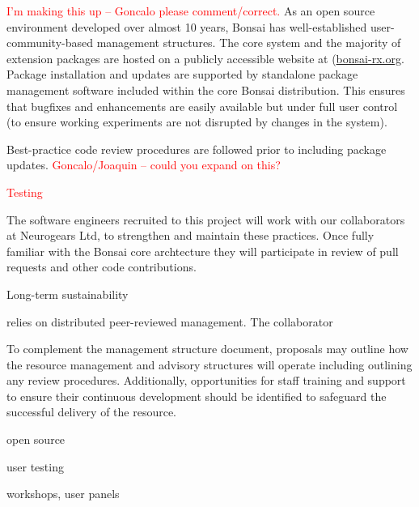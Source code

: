 \textcolor{red}{I'm making this up -- Goncalo please comment/correct.}
%
As an open source environment developed over almost 10 years, Bonsai 
has well-established user-community-based management structures.
%
The core system and the majority of extension packages are hosted on a
publicly accessible website at (\url{bonsai-rx.org}.
%
Package installation and updates are supported by standalone package
management software included within the core Bonsai distribution.
%
This ensures that bugfixes and enhancements are easily available but
under full user control (to ensure working experiments are not
disrupted by changes in the system).

Best-practice code review procedures are followed prior to including
package updates.  \textcolor{red}{Goncalo/Joaquin -- could you expand
  on this?}

\textcolor{red}{Testing}

The software engineers recruited to this project will work with our
collaborators at Neurogears Ltd, to strengthen and maintain these
practices.  Once fully familiar with the Bonsai core archtecture they
will participate in review of pull requests and other code
contributions.  



Long-term sustainability






relies on distributed peer-reviewed management.  The collaborator 


To complement the management structure document, proposals may outline
how the resource management and advisory structures will operate including
outlining any review procedures.
Additionally, opportunities for staff training and support to ensure their
continuous development should be identified to safeguard the successful
delivery of the resource.



open source

user testing

workshops, user panels

